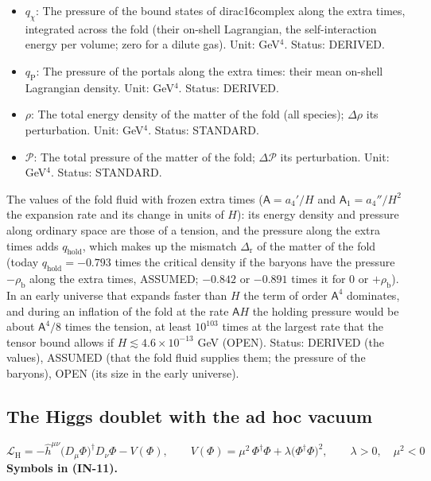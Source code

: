 \documentclass[
  10pt,
]{article}
\begin{document}
\begin{itemize}
\item
  \(q_\chi\): The pressure of the bound states of dirac16complex along
  the extra times, integrated across the fold (their on-shell
  Lagrangian, the self-interaction energy per volume; zero for a dilute
  gas). Unit: GeV\(^4\). Status: DERIVED.
\item
  \(q_{\mathrm{P}}\): The pressure of the portals along the extra times:
  their mean on-shell Lagrangian density. Unit: GeV\(^4\). Status:
  DERIVED.
\item
  \(\rho\): The total energy density of the matter of the fold (all
  species); \(\Delta\rho\) its perturbation. Unit: GeV\(^4\). Status:
  STANDARD.
\item
  \(\mathcal{P}\): The total pressure of the matter of the fold;
  \(\Delta\mathcal{P}\) its perturbation. Unit: GeV\(^4\). Status:
  STANDARD.
\end{itemize}

The values of the fold fluid with frozen extra times
(\(\mathsf{A} = a_4'/H\) and \(\mathsf{A}_1 = a_4''/H^2\) the expansion
rate and its change in units of \(H\)): its energy density and pressure
along ordinary space are those of a tension, and the pressure along the
extra times adds \(q_{\mathrm{hold}}\), which makes up the mismatch
\(\Delta_{\mathrm{r}}\) of the matter of the fold (today
\(q_{\mathrm{hold}} = -0.793\) times the critical density if the baryons
have the pressure \(-\rho_{\mathrm{b}}\) along the extra times, ASSUMED;
\(-0.842\) or \(-0.891\) times it for 0 or \(+\rho_{\mathrm{b}}\)). In
an early universe that expands faster than \(H\) the term of order
\(\mathsf{A}^4\) dominates, and during an inflation of the fold at the
rate \(\mathsf{A}H\) the holding pressure would be about
\(\mathsf{A}^4/8\) times the tension, at least \(10^{103}\) times at the
largest rate that the tensor bound allows if
\(H \lesssim 4.6\times10^{-13}\) GeV (OPEN). Status: DERIVED (the
values), ASSUMED (that the fold fluid supplies them; the pressure of the
baryons), OPEN (its size in the early universe).

\hypertarget{the-higgs-doublet-with-the-ad-hoc-vacuum}{%
\subsection{The Higgs doublet with the ad hoc
vacuum}\label{the-higgs-doublet-with-the-ad-hoc-vacuum}}

\[
\mathcal{L}_{\mathrm{H}} = -\hat h^{\mu\nu}\big(D_\mu\Phi\big)^\dagger D_\nu\Phi - V(\Phi),\qquad
V(\Phi) = \mu^2\,\Phi^\dagger\Phi + \lambda\big(\Phi^\dagger\Phi\big)^2,\qquad \lambda > 0,\quad \mu^2 < 0 \tag{IN-11}
\] \textbf{Symbols in (IN-11).}
\end{document}
